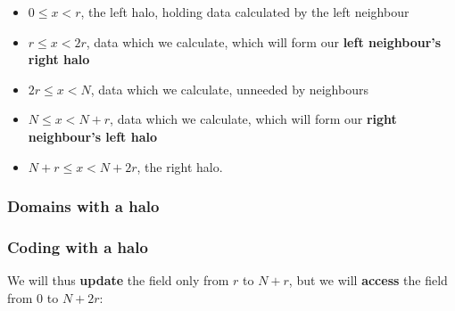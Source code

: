 \begin{itemize}
\itemsep1pt\parskip0pt
\item
  $0 \le x < r$, the left halo, holding data calculated by the left
  neighbour
\item
  $r \le x < 2r$, data which we calculate, which will form our
  \textbf{left neighbour's right halo}
\item
  $2r \le x < N$, data which we calculate, unneeded by neighbours
\item
  $N \le x < N+r$, data which we calculate, which will form our
  \textbf{right neighbour's left halo}
\item
  $N+r \le x < N+2r$, the right halo.
\end{itemize}

\subsubsection{Domains with a halo}\label{domains-with-a-halo-1}

\begin{Shaded}
\begin{Highlighting}[]

    \NormalTok{),}
\end{Highlighting}
\end{Shaded}

\subsubsection{Coding with a halo}\label{coding-with-a-halo}

We will thus \textbf{update} the field only from $r$ to $N+r$, but we
will \textbf{access} the field from $0$ to $N+2r$:

\begin{Shaded}
\begin{Highlighting}[]
 \NormalTok{; } 
\end{Highlighting}
\end{Shaded}

